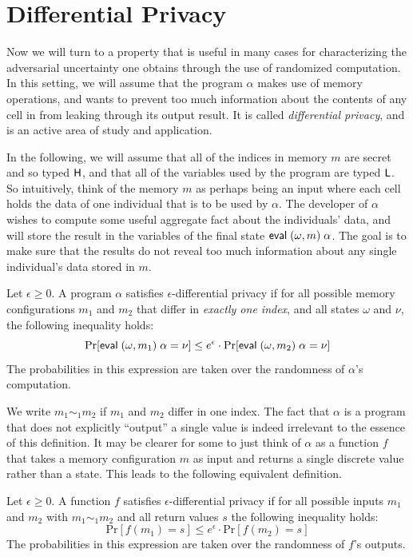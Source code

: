 \documentclass[11pt]{article}
\begin{document}
\section{Differential Privacy}

Now we will turn to a property that is useful in many cases for
characterizing the adversarial uncertainty one obtains through the use
of randomized computation. In this setting, we will assume that the
program $\alpha$ makes use of memory operations, and wants to prevent
too much information about the contents of any cell in from
leaking through its output result. It is called \emph{differential
  privacy}, and is an active area of study and application.

In the following, we will assume that all of the indices in memory $m$
are secret and so typed $\mathsf{H}$, and that all of the variables used by
the program are typed $\mathsf{L}$. So intuitively, think of the memory
$m$ as perhaps being an input where each cell holds the data of
one individual that is to be used by $\alpha$. The developer of $\alpha$
wishes to compute some useful aggregate fact about the individuals'
data, and will store the result in the variables of the final state
$\mathsf{eval}\; (\omega, m)\; \alpha$. The goal is to make sure that the
results do not reveal too much information about any single individual's
data stored in $m$.

\begin{definition}
\label{def:dp1}
Let $\epsilon \geq 0$. A program $\alpha$ satisfies $\epsilon$-differential
privacy if for all possible memory configurations $m_1$ and
$m_2$ that differ in \emph{exactly one index}, and all states
$\omega$ and $\nu$, the following inequality holds:
\[
\mathrm{Pr}[\mathsf{eval}\; (\omega,m_1)\; \alpha= \nu] \le e^\epsilon \cdot \mathrm{Pr}[\mathsf{eval}\; (\omega,m_2)\; \alpha = \nu]
\]
The probabilities in this expression are taken over the randomness of
$\alpha$'s computation.
\end{definition}

We write $m_1 \sim_1 m_2$ if $m_1$ and $m_2$ differ in one index.  The fact that
$\alpha$ is a program that does not explicitly ``output'' a single value is
indeed irrelevant to the essence of this definition. It may be clearer for some
to just think of $\alpha$ as a function $f$ that takes a memory configuration
$m$ as input and returns a single discrete value rather than a state. This leads
to the following equivalent definition.

\begin{definition}
\label{def:dp}
Let $\epsilon \geq 0$. A function $f$ satisfies $\epsilon$-differential
privacy if for all possible inputs $m_1$ and $m_2$ with $m_1 \sim_1 m_2$
and all return values $s$ the following inequality holds:
\[
\mathrm{Pr}[f(m_1) = s] \le e^\epsilon \cdot \mathrm{Pr}[f(m_2) = s]
\]
The probabilities in this expression are taken over the randomness of $f$'s
outputs.
\end{definition}
\end{document}
